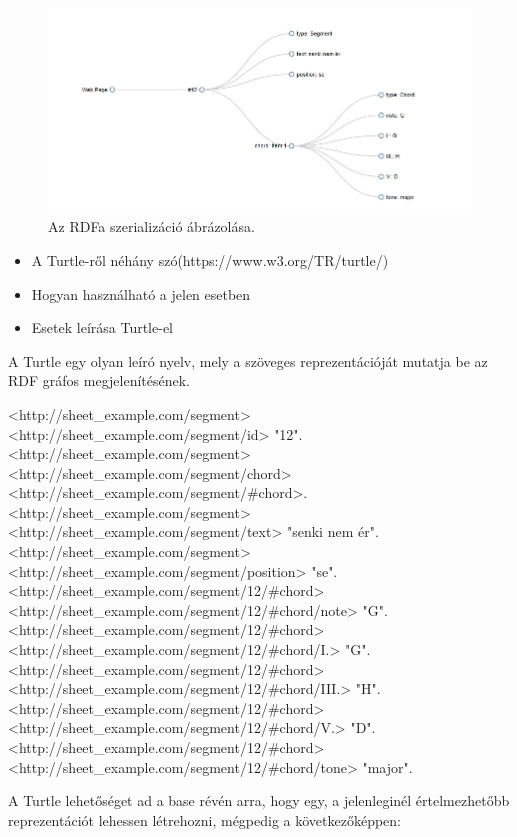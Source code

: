 \begin{figure}[h]
	\includegraphics[scale=0.8]{images/misc/RDFa_serialization_example.jpg}
	\caption{Az RDFa szerializáció ábrázolása.}
	\label{fig:rdfa}
\end{figure}


\begin{itemize}
\item A Turtle-ről néhány szó(https://www.w3.org/TR/turtle/)
\item Hogyan használható a jelen esetben
\item Esetek leírása Turtle-el
\end{itemize}

A Turtle egy olyan leíró nyelv, mely a szöveges reprezentációját mutatja be az RDF gráfos megjelenítésének.
\begin{xml}
<http://sheet_example.com/segment> <http://sheet_example.com/segment/id> "12".
<http://sheet_example.com/segment> <http://sheet_example.com/segment/chord> <http://sheet_example.com/segment/#chord>.
<http://sheet_example.com/segment> <http://sheet_example.com/segment/text> "senki nem ér".
<http://sheet_example.com/segment> <http://sheet_example.com/segment/position> "se".
<http://sheet_example.com/segment/12/#chord> <http://sheet_example.com/segment/12/#chord/note> "G".
<http://sheet_example.com/segment/12/#chord> <http://sheet_example.com/segment/12/#chord/I.> "G".
<http://sheet_example.com/segment/12/#chord> <http://sheet_example.com/segment/12/#chord/III.> "H".
<http://sheet_example.com/segment/12/#chord> <http://sheet_example.com/segment/12/#chord/V.> "D".
<http://sheet_example.com/segment/12/#chord> <http://sheet_example.com/segment/12/#chord/tone> "major".
\end{xml}

A Turtle lehetőséget ad a base révén arra, hogy egy, a jelenleginél értelmezhetőbb reprezentációt lehessen létrehozni, mégpedig a következőképpen:


